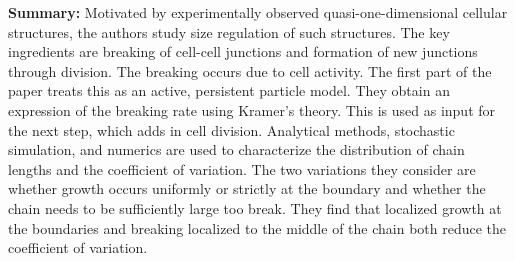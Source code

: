 \documentclass[12pt,oneside,letterpaper]{article}
\begin{document}
\textbf{Summary:} Motivated by experimentally observed quasi-one-dimensional cellular structures, the authors study size regulation of such structures. The key ingredients are breaking of cell-cell junctions and formation of new junctions through division. The breaking occurs due to cell activity. The first part of the paper treats this as an active, persistent particle model. They obtain an expression of the breaking rate using Kramer's theory. This is used as input for the next step, which adds in cell division. Analytical methods, stochastic simulation, and numerics are used to characterize the distribution of chain lengths and the coefficient of variation. The two variations they consider are whether growth occurs uniformly or strictly at the boundary and whether the chain needs to be sufficiently large too break. They find that localized growth at the boundaries and breaking localized to the middle of the chain both reduce the coefficient of variation.
\end{document}
